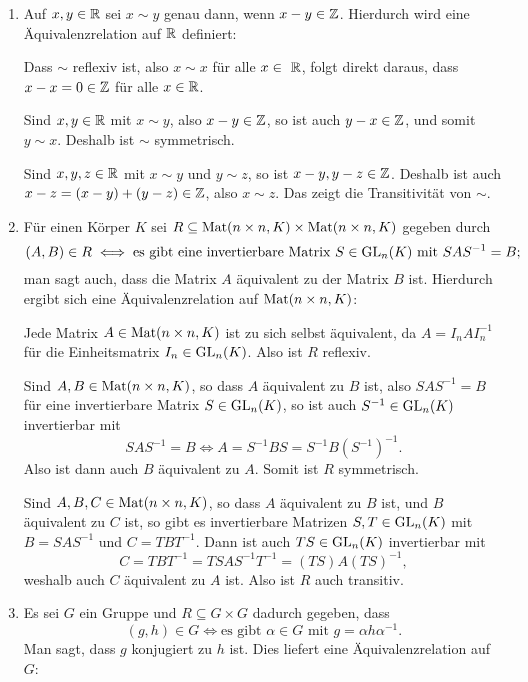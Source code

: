 \begin{bsp}
\begin{enumerate}[leftmargin=*]
  \item
   Auf $x,y \in \mathbb{R}$ sei $x \sim y$ genau dann, wenn $x-y \in \mathbb{Z}$. Hierdurch wird eine Äquivalenzrelation auf $\mathbb{R}$ definiert:
   
   Dass $\sim$ reflexiv ist, also $x \sim x$ für alle $x \in\ \mathbb{R}$, folgt direkt daraus, dass $x-x = 0 \in \mathbb{Z}$ für alle $x \in \mathbb{R}$.
   
   Sind $x,y \in \mathbb{R}$ mit $x \sim y$, also $x-y \in \mathbb{Z}$, so ist auch $y-x \in \mathbb{Z}$, und somit $y \sim x$. Deshalb ist $\sim$ symmetrisch.
   
   Sind $x,y,z \in \mathbb{R}$ mit $x \sim y$ und $y \sim z$, so ist $x-y, y-z \in \mathbb{Z}$. Deshalb ist auch $x-z = (x-y)+(y-z) \in \mathbb{Z}$, also $x \sim z$. Das zeigt die Transitivität von $\sim$.
  
  \item
   Für einen Körper $K$ sei $R \subseteq \mathrm{Mat}(n \times n, K) \times \mathrm{Mat}(n \times n, K)$ gegeben durch
   \[
    (A,B) \in R \iff \text{es gibt eine invertierbare Matrix $S \in \mathrm{GL}_n(K)$ mit $SAS^{-1} = B$};
   \]
   man sagt auch, dass die Matrix $A$ äquivalent zu der Matrix $B$ ist. Hierdurch ergibt sich eine Äquivalenzrelation auf $\mathrm{Mat}(n \times n, K)$:
   
   Jede Matrix $A \in \mathrm{Mat}(n \times n, K)$ ist zu sich selbst äquivalent, da $A = I_n A I_n^{-1}$ für die Einheitsmatrix $I_n \in \mathrm{GL}_n(K)$. Also ist $R$ reflexiv.
   
   Sind $A, B \in \mathrm{Mat}(n \times n, K)$, so dass $A$ äquivalent zu $B$ ist, also $S A S^{-1} = B$ für eine invertierbare Matrix $S \in \mathrm{GL}_n(K)$, so ist auch $S^{-1} \in \mathrm{GL}_n(K)$ invertierbar mit
   \[
    S A S^{-1} = B \iff A = S^{-1} B S = S^{-1} B (S^{-1})^{-1}.
   \]
   Also ist dann auch $B$ äquivalent zu $A$. Somit ist $R$ symmetrisch.
   
   Sind $A,B,C \in \mathrm{Mat}(n \times n, K)$, so dass $A$ äquivalent zu $B$ ist, und $B$ äquivalent zu $C$ ist, so gibt es invertierbare Matrizen $S,T \in \mathrm{GL}_n(K)$ mit $B = SAS^{-1}$ und $C = TBT^{-1}$. Dann ist auch $TS \in \mathrm{GL}_n(K)$ invertierbar mit
   \[
    C = T B T^{-1} = T S A S^{-1} T^{-1} = (TS) A (TS)^{-1},
   \]
   weshalb auch $C$ äquivalent zu $A$ ist. Also ist $R$ auch transitiv.
  
  \item
   Es sei $G$ ein Gruppe und $R \subseteq G \times G$ dadurch gegeben, dass
   \[
    (g,h) \in G \iff \text{es gibt $\alpha \in G$ mit $g = \alpha h \alpha^{-1}$}.
   \]
   Man sagt, dass $g$ konjugiert zu $h$ ist. Dies liefert eine Äquivalenzrelation auf $G$:
   

\end{enumerate}
\end{bsp}
